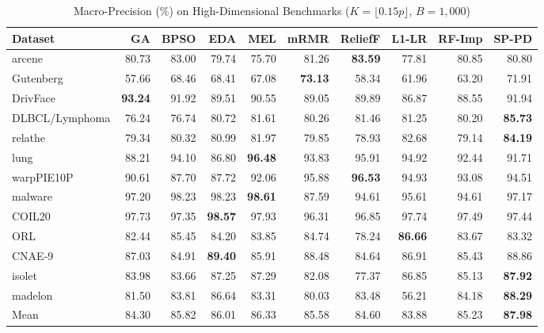 \begin{table}[!t]
\centering
\begin{threeparttable}
\caption{Macro-Precision (\%) on High-Dimensional Benchmarks ($K = \lfloor 0.15p \rfloor$, $B = 1{,}000$)}
\label{tab:highdim_wide}
\scriptsize
\setlength{\tabcolsep}{7.0pt}
\renewcommand{\arraystretch}{1.06}
\begin{tabular}{@{}lrrrrrrrrr@{}}
\toprule
Dataset & GA & BPSO & EDA & MEL & mRMR & ReliefF & L1-LR & RF-Imp & SP-PD \\
\midrule
arcene                    & 80.73 & 83.00 & 79.74 & 75.70 & 81.26 & \textbf{83.59} & 77.81 & 80.85 & 80.80 \\
Gutenberg                 & 57.66 & 68.46 & 68.41 & 67.08 & \textbf{73.13} & 58.34 & 61.96 & 63.20 & 71.91 \\
DrivFace                  & \textbf{93.24} & 91.92 & 89.51 & 90.55 & 89.05 & 89.89 & 86.87 & 88.55 & 91.94 \\
DLBCL/Lymphoma\tnote{a} & 76.24 & 76.74 & 80.72 & 81.61 & 80.26 & 81.46 & 81.25 & 80.20 & \textbf{85.73} \\
relathe                   & 79.34 & 80.32 & 80.99 & 81.97 & 79.85 & 78.93 & 82.68 & 79.14 & \textbf{84.19} \\
lung                      & 88.21 & 94.10 & 86.80 & \textbf{96.48} & 93.83 & 95.91 & 94.92 & 92.44 & 91.71 \\
warpPIE10P                & 90.61 & 87.70 & 87.72 & 92.06 & 95.88 & \textbf{96.53} & 94.93 & 93.08 & 94.51 \\
malware                   & 97.20 & 98.23 & 98.23 & \textbf{98.61} & 87.59 & 94.61 & 95.61 & 94.61 & 97.17 \\
COIL20                    & 97.73 & 97.35 & \textbf{98.57} & 97.93 & 96.31 & 96.85 & 97.74 & 97.49 & 97.44 \\
ORL                       & 82.44 & 85.45 & 84.20 & 83.85 & 84.74 & 78.24 & \textbf{86.66} & 83.67 & 83.32 \\
CNAE-9                    & 87.03 & 84.91 & \textbf{89.40} & 85.91 & 88.48 & 84.64 & 86.91 & 85.43 & 88.86 \\
isolet                    & 83.98 & 83.66 & 87.25 & 87.29 & 82.08 & 77.37 & 86.85 & 85.13 & \textbf{87.92} \\
madelon                   & 81.50 & 83.81 & 86.64 & 83.31 & 80.03 & 83.48 & 56.21 & 84.18 & \textbf{88.29} \\
\midrule
Mean                      & 84.30 & 85.82 & 86.01 & 86.33 & 85.58 & 84.60 & 83.88 & 85.23 & \textbf{87.98} \\

\end{tabular}
\end{threeparttable}
\end{table}

